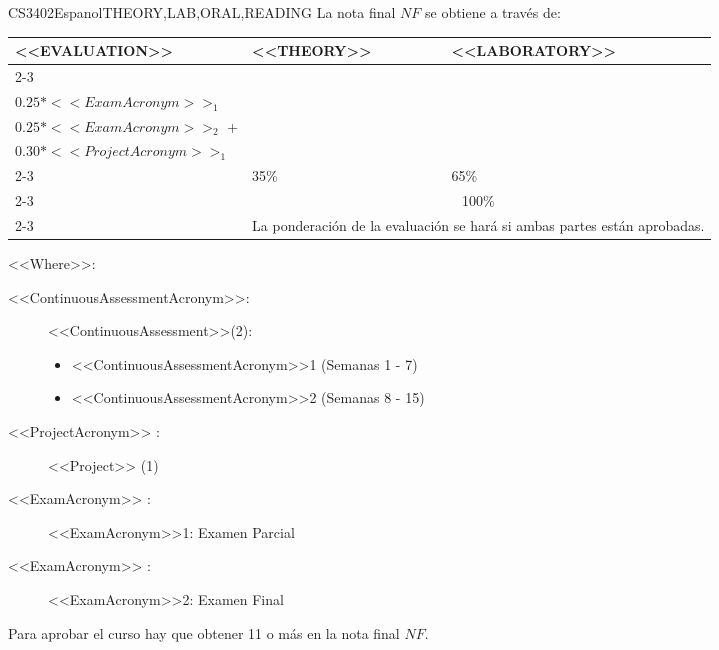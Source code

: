  
  \begin{evaluation}{CS3402}{Espanol}{THEORY,LAB,ORAL,READING}
  La nota final $NF$ se obtiene a través de:

  \begin{tabularx}{0.9\textwidth}{|X|p{}|p{}|} \hline
  \multirow{4}{*}{\uppercase{<<Evaluation>>}} & \uppercase{<<Theory>>} & \uppercase{<<Laboratory>>} \\ \cline{2-3}
  & %
      \begin{minipage}{0.95\textwidth}
      \begin{tabular}{l}
        $0.10*<<ContinuousAssessmentAcronym>>_{1}$  + \\
        $0.25*<<ExamAcronym>>_{1}$ 
      \end{tabular} 
      \end{minipage} 
  & %
      \begin{minipage}{0.95\textwidth}
      \begin{tabular}{l}
        $0.10*<<ContinuousAssessmentAcronym>>_{2}$  + \\
        $0.25*<<ExamAcronym>>_{2}$  +  \\
        $0.30*<<ProjectAcronym>>_{1}$
      \end{tabular} 
      \end{minipage}                 \\ \cline{2-3}
  
  & %
  35\% 
  & %
  65\% \\ \cline{2-3}
  & \multicolumn{2}{|c|}{100\%}  \\ \cline{2-3}
  & \multicolumn{2}{|c|}{La ponderación de la evaluación se hará si ambas partes están aprobadas.}  \\ \hline
  \end{tabularx}
    
  \vspace{2mm}
  \noindent <<Where>>:
  \begin{description}
      \item[<<ContinuousAssessmentAcronym>>:]<<ContinuousAssessment>>(2):
      \begin{itemize}
              \item <<ContinuousAssessmentAcronym>>1 (Semanas 1 - 7) 
              \item <<ContinuousAssessmentAcronym>>2 (Semanas 8 - 15)
      \end{itemize}
      \item[<<ProjectAcronym>> :] <<Project>> (1)
      \item[<<ExamAcronym>> :] <<ExamAcronym>>1: Examen Parcial
      \item[<<ExamAcronym>> :] <<ExamAcronym>>2: Examen Final
  \end{description}

  \noindent Para aprobar el curso hay que obtener 11 o más en la nota final $NF$.
  \end{evaluation}
 
